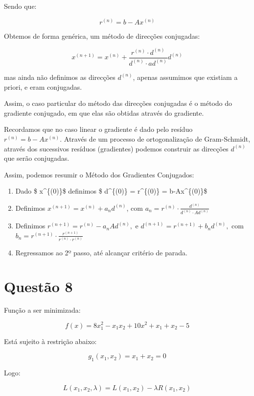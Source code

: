 \documentclass[11pt]{article}
\begin{document}
Sendo que:

\[  r^{(n)} =  b - Ax^{(n)} \]

Obtemos de forma genérica, um método de direcções conjugadas:

\[x^{(n+1)} = x^{(n)} + \frac{ r^{(n)} \cdot d^{(n)} }{ d^{(n)} \cdot ad^{(n)} } d^{(n)}\]

mas ainda não definimos as direcções \(d^{(n)}\), apenas assumimos que
existiam a priori, e eram conjugadas.

Assim, o caso particular do método das direcções conjugadas é o método
do gradiente conjugado, em que elas são obtidas através do gradiente.

Recordamos que no caso linear o gradiente é dado pelo resíduo
\(r^{(n)} = b - Ax^{(n)}.\) Através de um processo de ortogonalização de
Gram-Schmidt, através dos sucessivos resíduos (gradientes) podemos
construir as direcções \(d^{(n)}\) que serão conjugadas.

Assim, podemos resumir o Método dos Gradientes Conjugados:

\begin{enumerate}
\def\labelenumi{\arabic{enumi}.}
\item
  Dado \$ x\^{}\{(0)\}\$ definimos \$ d\^{}\{(0)\} = r\^{}\{(0)\} =
  b-Ax\^{}\{(0)\}\$
\item
  Definimos \(x^{(n+1)} = x^{(n)}+ a_n d^{(n)}\), com
  \(a_n = r^{(n)} \cdot \frac {d^{(n)}} {d^{(n)} \cdot Ad^{(n)}}\)
\item
  Definimos \(r^{(n+1)} = r^{(n)} - a_n Ad^{(n)},\) e
  \(d^{(n+1)} = r^{(n+1)} + b_n d^{(n)},\) com
  \(b_n = r^{(n+1)} \cdot \frac {r^{(n+1)}}{r^{(n)} \cdot r^{(n)}}\)
\item
  Regressamos ao 2º passo, até alcançar critério de parada.
\end{enumerate}

    \section{Questão 8}\label{questuxe3o-8}

    Função a ser minimizada:

\[ f(x) = 8x_1^2 - x_1x_2 + 10x^2 + x_1 + x_2 - 5\]

Está sujeito à restrição abaixo:

\[ g_1(x_1,x_2) = x_1 + x_2 = 0\]

Logo:

\[L(x_1,x_2,\lambda) = L (x_1,x_2) - \lambda R(x_1,x_2) \]
\end{document}
